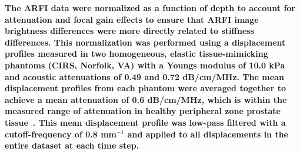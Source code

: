 \textbf{The ARFI data were normalized as a function of depth to account for   
attenuation and focal gain effects to ensure that ARFI image brightness
differences were more directly related to stiffness differences.  This                
normalization was performed using a displacement profiles measured in two            
homogeneous, elastic tissue-mimicking phantoms (CIRS, Norfolk, VA) with a          
Youngs modulus of 10.0 kPa and acoustic attenuations of 0.49 and 0.72 dB/cm/MHz.        
The mean displacement profiles from each phantom were averaged together to
achieve a mean attenuation of 0.6 dB/cm/MHz, which is within the measured
range of attenuation in healthy peripheral zone prostate
tissue~\cite{Parker1993}.  This mean displacement profile was low-pass filtered
with a cutoff-frequency of 0.8 mm$^{-1}$ and applied to all displacements in
the entire dataset at each time step.}
